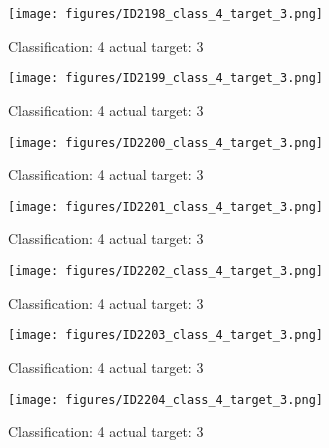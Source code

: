 \begin{figure}[h!]
\begin{center}
\texttt{[image: figures/ID2198\_class\_4\_target\_3.png]}
\end{center}
\caption{ Classification: 4 actual target: 3}
\label{fig:ID2198_class_4_target_3}
\end{figure}
\begin{figure}[h!]
\begin{center}
\texttt{[image: figures/ID2199\_class\_4\_target\_3.png]}
\end{center}
\caption{ Classification: 4 actual target: 3}
\label{fig:ID2199_class_4_target_3}
\end{figure}
\begin{figure}[h!]
\begin{center}
\texttt{[image: figures/ID2200\_class\_4\_target\_3.png]}
\end{center}
\caption{ Classification: 4 actual target: 3}
\label{fig:ID2200_class_4_target_3}
\end{figure}
\begin{figure}[h!]
\begin{center}
\texttt{[image: figures/ID2201\_class\_4\_target\_3.png]}
\end{center}
\caption{ Classification: 4 actual target: 3}
\label{fig:ID2201_class_4_target_3}
\end{figure}
\begin{figure}[h!]
\begin{center}
\texttt{[image: figures/ID2202\_class\_4\_target\_3.png]}
\end{center}
\caption{ Classification: 4 actual target: 3}
\label{fig:ID2202_class_4_target_3}
\end{figure}
\begin{figure}[h!]
\begin{center}
\texttt{[image: figures/ID2203\_class\_4\_target\_3.png]}
\end{center}
\caption{ Classification: 4 actual target: 3}
\label{fig:ID2203_class_4_target_3}
\end{figure}
\begin{figure}[h!]
\begin{center}
\texttt{[image: figures/ID2204\_class\_4\_target\_3.png]}
\end{center}
\caption{ Classification: 4 actual target: 3}
\label{fig:ID2204_class_4_target_3}
\end{figure}
